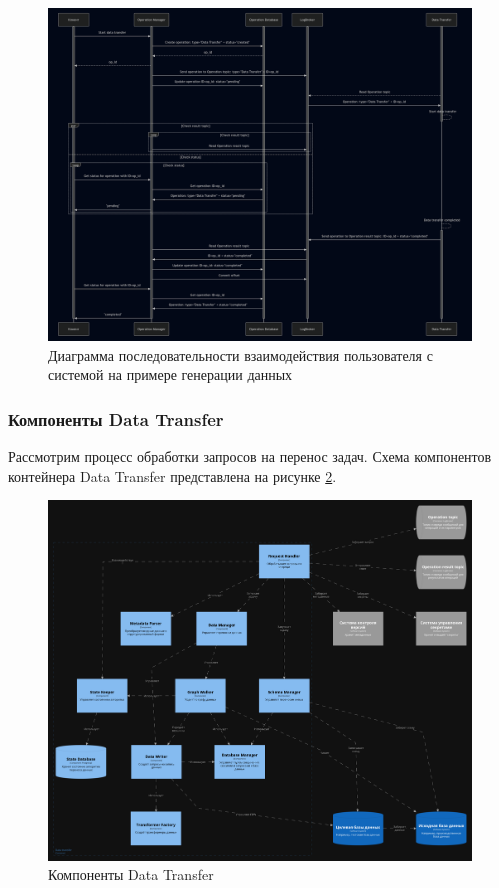 \begin{figure}
  \includegraphics[scale=0.2]{./img/mermaid-sequence-User-MainSystem.png}
  \caption{Диаграмма последовательности взаимодействия пользователя с системой на примере генерации данных}
  \label{Sequence User-MainSystem}
\end{figure}

\subsubsection{Компоненты Data Transfer}

Рассмотрим процесс обработки запросов на перенос задач. Схема компонентов контейнера Data Transfer представлена на рисунке \ref{Data Transfer Components}.

\begin{figure}
  \includegraphics[scale=0.12]{./img/structurizr-DataTransferComponents.png}
  \caption{Компоненты Data Transfer}
  \label{Data Transfer Components}
\end{figure}

